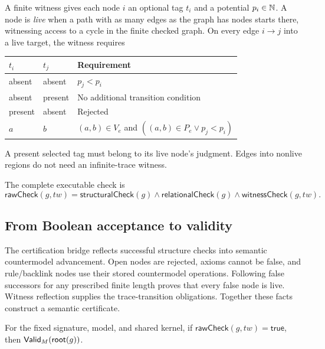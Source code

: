 A finite witness gives each node $i$ an optional tag $t_i$ and a potential
$p_i\in\mathbb{N}$. A node is \emph{live} when a path with as many edges as the
graph has nodes starts there, witnessing access to a cycle in the finite
checked graph. On every edge $i\to j$ into a live target, the witness requires
\begin{center}
\begin{tabular}{@{}lll@{}}
\toprule
$t_i$ & $t_j$ & Requirement\\
\midrule
absent & absent & $p_j<p_i$\\
absent & present & No additional transition condition\\
present & absent & Rejected\\
$a$ & $b$ & $(a,b)\in V_e$ and $((a,b)\in P_e\lor p_j<p_i)$\\
\bottomrule
\end{tabular}
\end{center}
A present selected tag must belong to its live node's judgment. Edges into
nonlive regions do not need an infinite-trace witness.

The complete executable check is
\[
 \mathsf{rawCheck}(g,tw)=
 \mathsf{structuralCheck}(g)\land\mathsf{relationalCheck}(g)
                      \land\mathsf{witnessCheck}(g,tw).
\]

\subsection{From Boolean acceptance to validity}
The certification bridge reflects successful structure checks into semantic
countermodel advancement. Open nodes are rejected, axioms cannot be false,
and rule/backlink nodes use their stored countermodel operations. Following
false successors for any prescribed finite length proves that every false
node is live. Witness reflection supplies the trace-transition obligations.
Together these facts construct a semantic certificate.

\begin{theorem}\label{thm:certificate}
For the fixed signature, model, and shared kernel, if
$\mathsf{rawCheck}(g,tw)=\mathsf{true}$, then $\mathsf{Valid}_M(\mathsf{root}(g))$.
\end{theorem}

